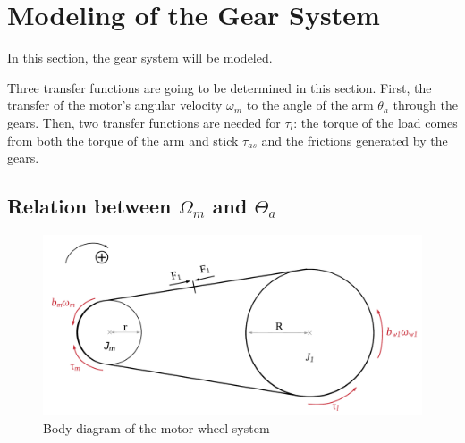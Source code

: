 \graphicspath{{figures/modeling/gearTrain/}}
\section{Modeling of the Gear System}\label{sec:ModGearSys}
In this section, the gear system will be modeled. 



Three transfer functions are going to be determined in this section. First, the transfer of the motor's angular velocity $\omega_m$ to the angle of the arm $\theta_a$ through the gears. Then, two transfer functions are needed for $\tau_l$: the torque of the load comes from both the torque of the arm and stick $\tau_{as}$ and the frictions generated by the gears.


\subsection{Relation between $\Omega_m$ and $\Theta_a$}

\begin{figure}[htbp]
	\centering
	\includegraphics[width=1\textwidth]{figures/modeling/gearTrain/GearAndBeltSystem.pdf}
	\caption{Body diagram of the motor wheel system}
	\label{fig:Belt&Pulley}
\end{figure}

\startexplain
{}
\stopexplain


